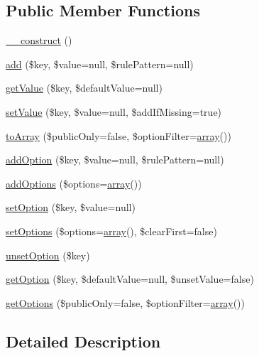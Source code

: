 \subsection*{Public Member Functions}
\begin{DoxyCompactItemize}
\item 
\hyperlink{classCPSOptionCollection_a095c5d389db211932136b53f25f39685}{\_\-\_\-construct} ()
\item 
\hyperlink{classCPSOptionCollection_a08c68129fce5aa8f1f5249a7f414e1c5}{add} (\$key, \$value=null, \$rulePattern=null)
\item 
\hyperlink{classCPSOptionCollection_a6396460647ad00b3d3e7b4a17ffba2cf}{getValue} (\$key, \$defaultValue=null)
\item 
\hyperlink{classCPSOptionCollection_af9c6e03c5c8d22713805cdfec266f5be}{setValue} (\$key, \$value=null, \$addIfMissing=true)
\item 
\hyperlink{classCPSOptionCollection_a0b2c058c88f3e26e33921dcf05063466}{toArray} (\$publicOnly=false, \$optionFilter=\hyperlink{list_8php_aa3205d038c7f8feb5c9f01ac4dfadc88}{array}())
\item 
\hyperlink{classCPSOptionCollection_aab6ce43b09210145cbaa172c0aa90850}{addOption} (\$key, \$value=null, \$rulePattern=null)
\item 
\hyperlink{classCPSOptionCollection_a81e3f5a80b8819b6b35f788ea02c1be5}{addOptions} (\$options=\hyperlink{list_8php_aa3205d038c7f8feb5c9f01ac4dfadc88}{array}())
\item 
\hyperlink{classCPSOptionCollection_a712d4f15cb85488b151858c0408e2094}{setOption} (\$key, \$value=null)
\item 
\hyperlink{classCPSOptionCollection_a37af0ef8b9249b85d1e65874b75b34d8}{setOptions} (\$options=\hyperlink{list_8php_aa3205d038c7f8feb5c9f01ac4dfadc88}{array}(), \$clearFirst=false)
\item 
\hyperlink{classCPSOptionCollection_a83519c09446eca599235b20a2cdcd094}{unsetOption} (\$key)
\item 
\hyperlink{classCPSOptionCollection_a4ad97078795bf124eea4d40f387ab03c}{getOption} (\$key, \$defaultValue=null, \$unsetValue=false)
\item 
\hyperlink{classCPSOptionCollection_ae6c9f80a7bf2bbc392f7cb4381050abf}{getOptions} (\$publicOnly=false, \$optionFilter=\hyperlink{list_8php_aa3205d038c7f8feb5c9f01ac4dfadc88}{array}())
\end{DoxyCompactItemize}


\subsection{Detailed Description}


